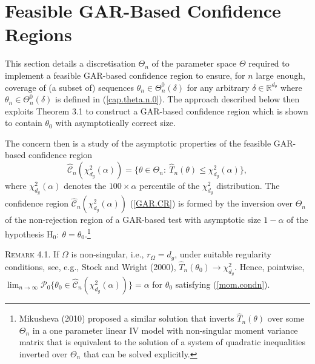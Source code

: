 \documentclass[hidelinks, 11 pt, a4paper, pdflatex]{article}
\begin{document}
{%


 \section{Feasible GAR-Based Confidence Regions}

  \setcounter{equation}{0}

  \indent This section details a discretisation $\Theta_{n}$ of the parameter space $\Theta$ required to implement a feasible GAR-based confidence region to ensure, for $n$ large enough, coverage of (a subset of) sequences $\theta_n \in \Theta_n^{0}(\delta)$ for any arbitrary $\delta \in \mathbb{R}^{d_{\theta}}$ where $\theta_n \in \Theta_n^{0}(\delta)$ is defined in (\ref{cap.theta.n.0}). The approach described below then exploits Theorem 3.1 to construct a GAR-based confidence region which is shown to contain $\theta_0$ with asymptotically correct size.

  The concern then is a study of the asymptotic properties of the feasible GAR-based confidence region
   \begin{equation} \label{GAR.CR}
    \hat{\mathcal{C}}_n(\chi_{d_{g}}^{2}(\alpha)) = \{\theta \in \Theta_n:~\hat{T}_n(\theta) \leq \chi_{d_{g}}^{2}(\alpha)\},
   \end{equation}
  where $\chi_{d_{g}}^{2}(\alpha)$ denotes the $100 \times \alpha$ percentile of the $\chi_{d_{g}}^{2}$ distribution. The confidence region $\hat{\mathcal{C}}_n(\chi_{d_{g}}^{2}(\alpha))$ (\ref{GAR.CR}) is formed by the inversion over $\Theta_n$ of the non-rejection region of a GAR-based test with asymptotic size $1 - \alpha$ of the hypothesis $\mathrm{H}_{0}:~\theta = \theta_{0}$.\footnote{Mikusheva (2010) proposed a similar solution that inverts $\hat{T}_{n}(\theta)$ over some $\Theta_n$ in a one parameter linear IV model with non-singular moment variance matrix that is equivalent to the solution of a system of quadratic inequalities inverted over $\Theta_n$ that can be solved explicitly.}

   \textsc{Remark 4.1}. If $\Omega$ is non-singular, i.e., $r_{\Omega} = d_{g}$, under suitable regularity conditions, see, e.g., Stock and Wright (2000), $\hat{T}_n(\theta_0)
    \rightarrow \chi_{d_{g}}^{2}$. Hence, pointwise, $\lim_{n \rightarrow \infty} \mathcal{P}_0\{\theta_0 \in \hat{\mathcal{C}}_n(\chi_{d_{g}}^{2}(\alpha))\} = \alpha$ for $\theta_0$ satisfying (\ref{mom.condn}).

}
\end{document}
